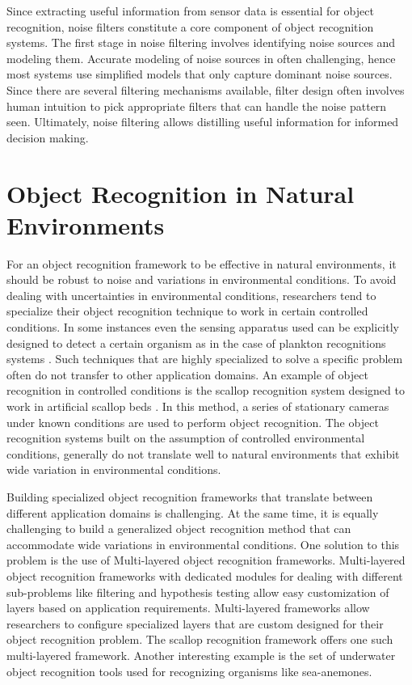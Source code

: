 Since extracting useful information from sensor data is essential for object recognition, noise filters constitute a core component of object recognition systems. The first stage in noise filtering involves identifying noise sources and modeling them. Accurate modeling of noise sources in often challenging, hence most systems use simplified models that only capture dominant noise sources. Since there are several filtering mechanisms available, filter design often involves human intuition to pick appropriate filters that can handle the noise pattern seen. Ultimately, noise filtering allows distilling useful information for informed decision making.

\section{Object Recognition in Natural Environments}

For an object recognition framework to be effective in natural environments, it
should be robust to noise and variations in environmental conditions. 
To avoid dealing with uncertainties in environmental conditions, researchers tend to specialize their object recognition technique to work in certain controlled conditions. In some instances even the sensing apparatus used can be explicitly designed to detect a certain organism as in the case of plankton 
recognitions systems \cite{mcgavin_plankton, stelzer_rotifier}. 
Such techniques that are highly specialized to solve a specific problem 
often do not transfer to other application domains. An example of object recognition in controlled conditions is the scallop recognition system designed to work in artificial scallop beds \cite{enomoto9,enomoto10}. In this method, a series of stationary cameras under known conditions are used to perform object recognition. The object recognition systems built on the assumption of controlled environmental conditions, generally do not translate well to natural environments that exhibit wide variation in environmental conditions.

Building specialized object recognition frameworks that translate between different application domains is challenging. 
At the same time, it is equally challenging to build a generalized object recognition method that can accommodate wide variations in environmental conditions. 
One solution to this problem is the use of Multi-layered object recognition frameworks. Multi-layered object recognition frameworks with dedicated modules for dealing with different sub-problems like filtering and hypothesis testing allow easy customization of layers based on application requirements. 
Multi-layered frameworks allow researchers to configure specialized layers that are custom designed for their object recognition problem. The scallop
recognition framework \cite{prasanna_aslo, prasanna_igi} offers one such multi-layered framework. Another interesting example is the set of underwater object recognition tools \cite{schoening} used for recognizing organisms like sea-anemones.

